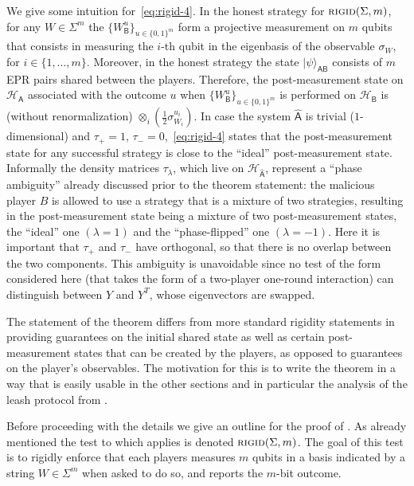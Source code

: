 \documentclass{toc}
\newcommand{\ket}[1]{|#1\rangle}
\newcommand{\reg}[1]{{\textsf{#1}}}
\newcommand{\mH}{\mathcal{H}}
\newcommand{\rigid}{\textsc{rigid}}
\begin{document}
We give some intuition for~\eqref{eq:rigid-4}. In the honest strategy for $\rigid(\Sigma,m)$, for any $W\in \Sigma^m$ the $\{ W_\reg{B}^u\}_{u\in\{0,1\}^m}$ form a projective measurement on $m$ qubits that consists in measuring the $i$-th qubit in the eigenbasis of the observable $\sigma_{W}$, for $i\in\{1,\ldots,m\}$. Moreover, in the honest strategy the state $\ket{\psi}_{\reg{AB}}$ consists of $m$ EPR pairs shared between the players. Therefore, the post-measurement state on $\mH_\reg{A}$ associated with the outcome $u$ when  $\{ W_\reg{B}^u\}_{u\in\{0,1\}^m}$ is performed on $\mH_\reg{B}$ is (without renormalization) $\otimes_i (\frac{1}{2}\sigma_{W_i}^{u_i})$. In case the system $\hat{\reg{A}}$ is trivial ($1$-dimensional) and $\tau_+=1$, $\tau_-=0$,~\eqref{eq:rigid-4}  states that the post-measurement state for any successful strategy is close to the ``ideal'' post-measurement state. Informally the density matrices $\tau_\lambda$, which live on $\mH_{\hat{\reg{A}}}$, represent a ``phase ambiguity'' already discussed prior to the theorem statement: the malicious player $B$ is allowed to use a strategy that is a mixture of two strategies, resulting in the post-measurement state being a mixture of two post-measurement states, the ``ideal'' one $(\lambda=1)$ and the ``phase-flipped'' one $(\lambda=-1)$. Here it is important that $\tau_+$ and $\tau_-$ have orthogonal, so that there is no overlap between the two components. This ambiguity is unavoidable since no test of the form considered here (that takes the form of a two-player one-round interaction) can distinguish between $Y$ and $Y^T$, whose eigenvectors are swapped.  

The statement of the theorem differs from more standard rigidity statements in providing guarantees on the initial shared state as well as certain post-measurement states that can be created by the players, as opposed to guarantees on the player's observables. The motivation for this is to write the theorem in a way that is easily usable in the other sections and in particular the analysis of the leash protocol from . 

\medskip

Before proceeding with the details we give an outline for the proof of . As already mentioned the test to which  applies is denoted $\rigid(\Sigma,m)$. The goal of this test is to rigidly enforce that each players measures $m$ qubits in a basis indicated by a string $W\in \Sigma^m$ when asked to do so, and reports the $m$-bit outcome. 
\end{document}
